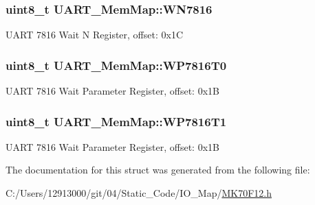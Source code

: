\subsubsection[{W\+N7816}]{\setlength{\rightskip}{0pt plus 5cm}uint8\+\_\+t U\+A\+R\+T\+\_\+\+Mem\+Map\+::\+W\+N7816}\label{struct_u_a_r_t___mem_map_aed09f864d4f1afe57f146ff72949c3d2}
U\+A\+R\+T 7816 Wait N Register, offset\+: 0x1\+C \hypertarget{struct_u_a_r_t___mem_map_a4555ab88b0e4f56c44b30d549b5b0666}{}
\subsubsection[{W\+P7816\+T0}]{\setlength{\rightskip}{0pt plus 5cm}uint8\+\_\+t U\+A\+R\+T\+\_\+\+Mem\+Map\+::\+W\+P7816\+T0}\label{struct_u_a_r_t___mem_map_a4555ab88b0e4f56c44b30d549b5b0666}
U\+A\+R\+T 7816 Wait Parameter Register, offset\+: 0x1\+B \hypertarget{struct_u_a_r_t___mem_map_a7d456ca4a3be9b4c083253fe2d30d404}{}
\subsubsection[{W\+P7816\+T1}]{\setlength{\rightskip}{0pt plus 5cm}uint8\+\_\+t U\+A\+R\+T\+\_\+\+Mem\+Map\+::\+W\+P7816\+T1}\label{struct_u_a_r_t___mem_map_a7d456ca4a3be9b4c083253fe2d30d404}
U\+A\+R\+T 7816 Wait Parameter Register, offset\+: 0x1\+B 

The documentation for this struct was generated from the following file\+:\begin{DoxyCompactItemize}
\item 
C\+:/\+Users/12913000/git/04/\+Static\+\_\+\+Code/\+I\+O\+\_\+\+Map/\hyperlink{_m_k70_f12_8h}{M\+K70\+F12.\+h}\end{DoxyCompactItemize}
